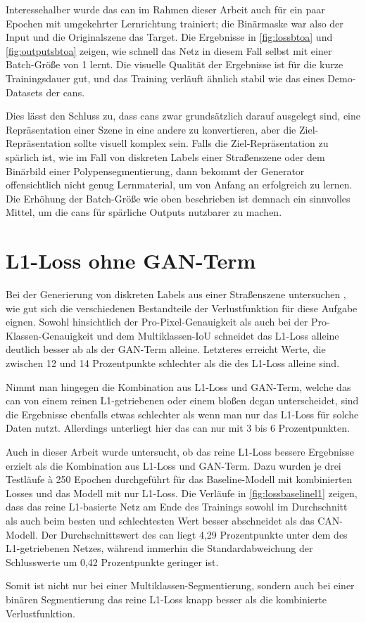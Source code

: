 Interessehalber wurde das \gls{can} im Rahmen dieser Arbeit auch für ein paar Epochen mit umgekehrter Lernrichtung trainiert; die Binärmaske war also der Input und die Originalszene das Target.
Die Ergebnisse in \autoref{fig:lossbtoa} und \autoref{fig:outputsbtoa} zeigen, wie schnell das Netz in diesem Fall selbst mit einer Batch-Größe von 1 lernt.
Die visuelle Qualität der Ergebnisse ist für die kurze Trainingsdauer gut, und das Training verläuft ähnlich stabil wie das eines Demo-Datasets der \glspl{can}.



Dies lässt den Schluss zu, dass \glspl{can} zwar grundsätzlich darauf ausgelegt sind, eine Repräsentation einer Szene in eine andere zu konvertieren, aber die Ziel-Repräsentation sollte visuell komplex sein.
Falls die Ziel-Repräsentation zu spärlich ist, wie im Fall von diskreten Labels einer Straßenszene oder dem Binärbild einer Polypensegmentierung, dann bekommt der Generator offensichtlich nicht genug Lernmaterial, um von Anfang an erfolgreich zu lernen.
Die Erhöhung der Batch-Größe wie oben beschrieben ist demnach ein sinnvolles Mittel, um die \glspl{can} für spärliche Outputs nutzbarer zu machen.



\section{L1-Loss ohne GAN-Term}

Bei der Generierung von diskreten Labels aus einer Straßenszene untersuchen \citeauthor{Isola.2017}, wie gut sich die verschiedenen Bestandteile der Verlustfunktion für diese Aufgabe eignen.
Sowohl hinsichtlich der Pro-Pixel-Genauigkeit als auch bei der Pro-Klassen-Genauigkeit und dem Multiklassen-IoU schneidet das L1-Loss alleine deutlich besser ab als der GAN-Term alleine.
Letzteres erreicht Werte, die zwischen 12 und 14 Prozentpunkte schlechter als die des L1-Loss alleine sind.

Nimmt man hingegen die Kombination aus L1-Loss und GAN-Term, welche das \gls{can} von einem reinen L1-getriebenen oder einem bloßen \gls{dcgan} unterscheidet, sind die Ergebnisse ebenfalls etwas schlechter als wenn man nur das L1-Loss für solche Daten nutzt.
Allerdings unterliegt hier das \gls{can} nur mit 3 bis 6 Prozentpunkten.

Auch in dieser Arbeit wurde untersucht, ob das reine L1-Loss bessere Ergebnisse erzielt als die Kombination aus L1-Loss und GAN-Term.
Dazu wurden je drei Testläufe à 250 Epochen durchgeführt für das Baseline-Modell mit kombinierten Losses und das Modell mit nur L1-Loss.
Die Verläufe in \autoref{fig:lossbaselinel1} zeigen, dass das reine L1-basierte Netz am Ende des Trainings sowohl im Durchschnitt als auch beim besten und schlechtesten Wert besser abschneidet als das CAN-Modell.
Der Durchschnittswert des \gls{can} liegt 4,29 Prozentpunkte unter dem des L1-getriebenen Netzes, während immerhin die Standardabweichung der Schlusswerte um 0,42 Prozentpunkte geringer ist.


Somit ist nicht nur bei einer Multiklassen-Segmentierung, sondern auch bei einer binären Segmentierung das reine L1-Loss knapp besser als die kombinierte Verlustfunktion.
